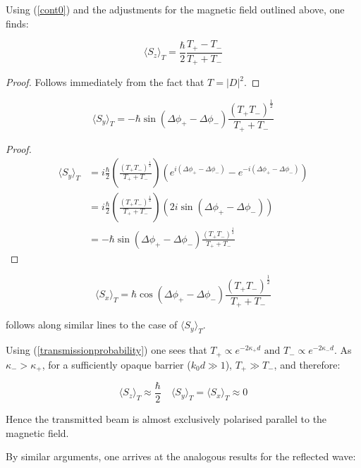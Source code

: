 \documentclass{article}
\begin{document}
\noindent Using (\ref{cont0}) and the adjustments for the magnetic field outlined above, one finds:

\begin{equation}
	\langle S_z \rangle_T = \frac{\hbar}{2}\frac{T_+-T_-}{T_++T_-}
\end{equation}


\begin{proof}
Follows immediately from the fact that $T=|D|^2$.
\end{proof}

\begin{equation}
	\langle S_y \rangle_T = -\hbar \sin{(\Delta\phi_+-\Delta\phi_-)}\frac{(T_+T_-)^{\frac{1}{2}}}{T_++T_-} 	
\end{equation}

\begin{proof}
\begin{align}
	\langle S_y \rangle_T &= i\frac{\hbar}{2}\left(\frac{(T_+T_-)^{\frac{1}{2}}}{T_++T_-}\right)\left(e^{i(\Delta\phi_+-\Delta\phi_-)}-e^{-i(\Delta\phi_+-\Delta\phi_-)}\right) \\
			    &= i\frac{\hbar}{2}\left(\frac{(T_+T_-)^{\frac{1}{2}}}{T_++T_-}\right)(2i\sin{(\Delta\phi_+-\Delta\phi_-)}) \\
			    &=-\hbar \sin{(\Delta\phi_+-\Delta\phi_-)}\frac{(T_+T_-)^{\frac{1}{2}}}{T_++T_-}
\end{align}
\end{proof}

\begin{equation}
	\langle S_x \rangle_T = \hbar \cos{(\Delta\phi_+-\Delta\phi_-)}\frac{(T_+T_-)^{\frac{1}{2}}}{T_++T_-}
\end{equation}

\noindent follows along similar lines to the case of $\langle S_y \rangle_T$.

\noindent Using (\ref{transmissionprobability}) one sees that $T_+ \propto e^{-2\kappa_+d} \text{ and } T_- \propto e^{-2\kappa_-d}$. As $\kappa_- > \kappa_+$, for a sufficiently opaque barrier ($k_0d \gg 1$), $T_+ \gg T_-$, and therefore:

\begin{equation}
	\langle S_z \rangle_T \approx \frac{\hbar}{2} \quad \langle S_y \rangle_T = \langle S_x \rangle_T \approx 0
\end{equation}

\noindent Hence the transmitted beam is almost exclusively polarised parallel to the magnetic field.

\noindent By similar arguments, one arrives at the analogous results for the reflected wave:
\end{document}
